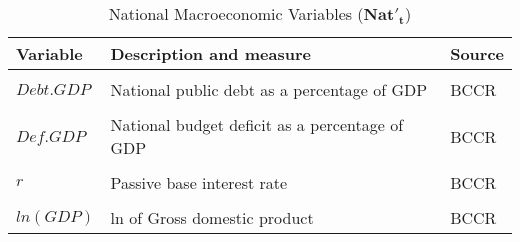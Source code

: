 \begin{table}[ht]
\caption{National Macroeconomic Variables ($\mathbf{Nat'_{t}}$)}
\centering
\begin{tabular}{l l l}
\hline\hline
Variable & Description and measure & Source \\ [0.5ex] 
\hline
\\
$Debt.GDP$ & National public debt as a percentage of GDP  & BCCR\\
\\
$Def.GDP$ & National budget deficit as a percentage of GDP  & BCCR\\
\\
$r$ & Passive base interest rate & BCCR\\
\\
$ln(GDP)$ & ln of Gross domestic product & BCCR\\
[1ex]
\hline
\end{tabular}
\label{table:nonlin}
\end{table}


